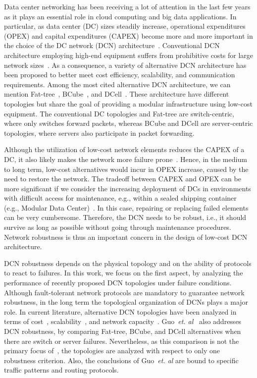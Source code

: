 Data center networking has been receiving a lot of attention in the last few years as it plays an essential role in cloud computing and big data applications. In particular, as data center (DC) sizes steadily increase, operational expenditures (OPEX) and capital expenditures (CAPEX) become more and more important in the choice of the DC network (DCN) architecture~\cite{jennings2014Cloud}. Conventional DCN architecture employing high-end equipment suffers from prohibitive costs for large network sizes~\cite{al2008scalable}. As a consequence, a variety of alternative DCN architecture has been proposed to better meet cost efficiency, scalability, and communication requirements. Among the most cited alternative DCN architecture, we can mention Fat-tree~\cite{al2008scalable}, BCube~\cite{guo2009bcube}, and DCell~\cite{guo2008dcell}. These architecture have different topologies but share the goal of providing a modular infrastructure using low-cost equipment. The conventional DC topologies and Fat-tree are switch-centric, 
where only 
switches forward packets, whereas BCube and DCell are server-centric topologies, where servers also participate in packet forwarding.

Although the utilization of low-cost network elements reduces the CAPEX of a DC, it also likely makes the network more failure prone~\cite{al2008scalable,guo2009bcube,greenber2009cost}. Hence, in the medium to long term, low-cost alternatives would incur in OPEX increase, caused by the need to restore the network. The tradeoff between CAPEX and OPEX can be more significant if we consider the increasing deployment of DCs in environments with difficult access for maintenance, e.g., within a sealed shipping container (e.g., Modular Data Center)~\cite{guo2009bcube}. In this case, repairing or replacing failed elements can be very cumbersome. Therefore, the DCN needs to be robust,
i.e., it should survive as long as possible without going through maintenance procedures. Network robustness is thus an important concern in the design of low-cost DCN architecture.

DCN robustness depends on the physical topology and on the ability of protocols to react to failures. In this work, we focus on the first aspect, by analyzing the performance of recently proposed DCN topologies under failure conditions. Although fault-tolerant network protocols are mandatory to guarantee network robustness, in the long term the topological organization of DCNs plays a major role. In current literature, alternative DCN topologies have been analyzed in terms of cost~\cite{popa2010cost}, scalability~\cite{danLi2011Scalable}, and network capacity~\cite{guo2009bcube}. Guo~\textit{et. al}~\cite{guo2009bcube} also addresses DCN robustness, by comparing Fat-tree, BCube, and DCell alternatives when there are switch or server failures. Nevertheless, as this comparison is not the primary focus of~\cite{guo2009bcube}, the topologies are analyzed with respect to only one robustness criterion. Also, the conclusions of Guo~\textit{et. al} are bound to specific traffic patterns and routing protocols.

